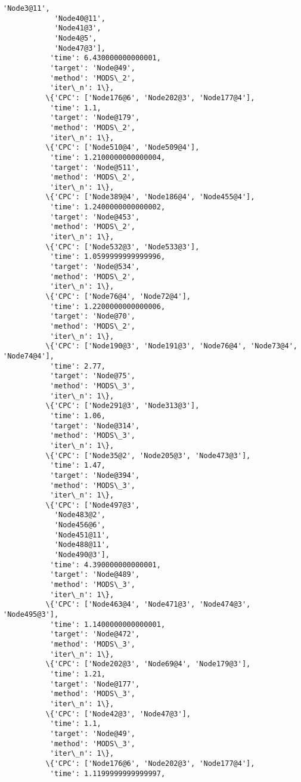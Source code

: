 \documentclass[11pt]{article}
\begin{document}
\begin{Verbatim}[commandchars=\\\{\}]
            'Node3@11',
            'Node40@11',
            'Node41@3',
            'Node4@5',
            'Node47@3'],
           'time': 6.430000000000001,
           'target': 'Node@49',
           'method': 'MODS\_2',
           'iter\_n': 1\},
          \{'CPC': ['Node176@6', 'Node202@3', 'Node177@4'],
           'time': 1.1,
           'target': 'Node@179',
           'method': 'MODS\_2',
           'iter\_n': 1\},
          \{'CPC': ['Node510@4', 'Node509@4'],
           'time': 1.2100000000000004,
           'target': 'Node@511',
           'method': 'MODS\_2',
           'iter\_n': 1\},
          \{'CPC': ['Node389@4', 'Node186@4', 'Node455@4'],
           'time': 1.2400000000000002,
           'target': 'Node@453',
           'method': 'MODS\_2',
           'iter\_n': 1\},
          \{'CPC': ['Node532@3', 'Node533@3'],
           'time': 1.0599999999999996,
           'target': 'Node@534',
           'method': 'MODS\_2',
           'iter\_n': 1\},
          \{'CPC': ['Node76@4', 'Node72@4'],
           'time': 1.2200000000000006,
           'target': 'Node@70',
           'method': 'MODS\_2',
           'iter\_n': 1\},
          \{'CPC': ['Node190@3', 'Node191@3', 'Node76@4', 'Node73@4', 'Node74@4'],
           'time': 2.77,
           'target': 'Node@75',
           'method': 'MODS\_3',
           'iter\_n': 1\},
          \{'CPC': ['Node291@3', 'Node313@3'],
           'time': 1.06,
           'target': 'Node@314',
           'method': 'MODS\_3',
           'iter\_n': 1\},
          \{'CPC': ['Node35@2', 'Node205@3', 'Node473@3'],
           'time': 1.47,
           'target': 'Node@394',
           'method': 'MODS\_3',
           'iter\_n': 1\},
          \{'CPC': ['Node497@3',
            'Node483@2',
            'Node456@6',
            'Node451@11',
            'Node488@11',
            'Node490@3'],
           'time': 4.390000000000001,
           'target': 'Node@489',
           'method': 'MODS\_3',
           'iter\_n': 1\},
          \{'CPC': ['Node463@4', 'Node471@3', 'Node474@3', 'Node495@3'],
           'time': 1.1400000000000001,
           'target': 'Node@472',
           'method': 'MODS\_3',
           'iter\_n': 1\},
          \{'CPC': ['Node202@3', 'Node69@4', 'Node179@3'],
           'time': 1.21,
           'target': 'Node@177',
           'method': 'MODS\_3',
           'iter\_n': 1\},
          \{'CPC': ['Node42@3', 'Node47@3'],
           'time': 1.1,
           'target': 'Node@49',
           'method': 'MODS\_3',
           'iter\_n': 1\},
          \{'CPC': ['Node176@6', 'Node202@3', 'Node177@4'],
           'time': 1.1199999999999997,

\end{Verbatim}
\end{document}
